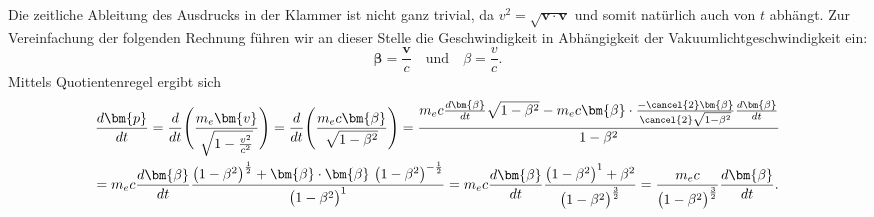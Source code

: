 Die zeitliche Ableitung des Ausdrucks in der Klammer ist nicht ganz trivial,
da \(v^2=\sqrt{\bm{v}\cdot\bm{v}}\)
und somit natürlich auch von \(t\) abhängt.
Zur Vereinfachung der folgenden Rechnung führen wir an dieser Stelle
die Geschwindigkeit in Abhängigkeit der Vakuumlichtgeschwindigkeit ein:
\begin{equation*}
    \bm{\beta} = \frac{\bm{v}}{c} \quad \text{und} \quad
    \beta = \frac{v}{c}.
\end{equation*}
Mittels Quotientenregel ergibt sich
\begin{multline*}
    \frac{d\bm{p}}{dt}
    = \frac{d}{dt} \Biggl(\frac{m_e \bm{v}}{\sqrt{1-\frac{v^2}{c^2}}}\Biggr)
    = \frac{d}{dt} \Biggl(\frac{m_e c \bm{\beta}}{\sqrt{1-\beta^2}}\Biggr)
    = \frac{m_ec\frac{d\bm{\beta}}{dt}\sqrt{1-\beta^2}
    -m_ec\bm{\beta}\cdot\frac{-\cancel{2}\bm{\beta}}{\cancel{2}\sqrt{1-\beta^2}}
    \frac{d\bm{\beta}}{dt}}{1-\beta^2}\\
    = m_ec\frac{d\bm{\beta}}{dt}\frac{\bigl(1-\beta^2\bigr)^\frac{1}{2}
    +\bm{\beta}\cdot\bm{\beta} \ \bigl(1-\beta^2\bigr)^{-\frac{1}{2}}}
    {\bigl(1-\beta^2\bigr)^1}
    = m_ec\frac{d\bm{\beta}}{dt}\frac{\bigl(1-\beta^2\bigr)^1
    +\beta^2}{\bigl(1-\beta^2\bigr)^\frac{3}{2}}
    = \frac{m_ec}{\bigl(1-\beta^2\bigr)^\frac{3}{2}}\frac{d\bm{\beta}}{dt}.
\end{multline*}

